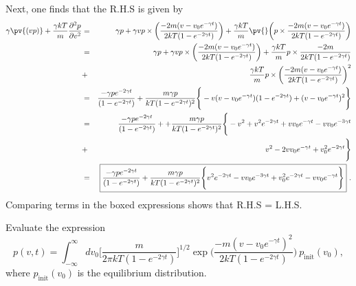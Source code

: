 Next, one finds that the R.H.S is given by
\begin{eqnarray}
\gamma \pv{(vp)} + \frac{\gamma k T}{m} \frac{\partial^2 p}{\partial v^2} &=& \gamma p + \gamma v p \times \bigg( \frac{-2 m (v-v_0 e^{-\gamma t})}{2 k T (1-e^{-2\gamma t})} \bigg) 
+  \frac{\gamma k T}{m} \pv{} \bigg( p \times  \frac{-2 m (v-v_0 e^{-\gamma t})}{2 k T (1-e^{-2\gamma t})}  \bigg) \nonumber \\
&=& \gamma p + \gamma v p \times \bigg( \frac{-2 m (v-v_0 e^{-\gamma t})}{2 k T (1-e^{-2\gamma t})} \bigg) 
+ \frac{\gamma k T}{m}  p \times  \frac{-2 m}{2 k T (1-e^{-2\gamma t})} \nonumber \\
&+& \frac{\gamma k T}{m} p \times \bigg( \frac{-2 m (v-v_0 e^{-\gamma t})}{2 k T (1-e^{-2\gamma t})} \bigg)^2 \nonumber \\
&=& \frac{-\gamma p e^{-2 \gamma t}}{(1-e^{-2 \gamma t})} + \frac{m\gamma p}{k T (1-e^{-2 \gamma t})^2} \Bigg\{ -v (v-v_0 e^{-\gamma t}) (1- e^{-2\gamma t}) +  (v-v_0 e^{-\gamma t})^2\Bigg\} \nonumber \\
&=& \frac{-\gamma p e^{-2 \gamma t}}{(1-e^{-2 \gamma t})} + + \frac{m\gamma p}{k T (1-e^{-2 \gamma t})^2} \Bigg\{ -v^2 + v^2 e^{-2 \gamma t} + v v_0 e^{-\gamma t} - v v_0 e^{-3 \gamma t} \nonumber \\\
&+& v^2 -2 v v_0 e^{-\gamma t} + v_0 ^2 e^{-2 \gamma t} \Bigg\} \nonumber \\
&=& \boxed{\frac{-\gamma p e^{-2 \gamma t}}{(1-e^{-2 \gamma t})} + \frac{m\gamma p}{k T (1-e^{-2 \gamma t})^2} \Bigg\{ v^2 e^{-2 \gamma t} - v v_0 e^{-3 \gamma t} + v_0 ^2 e^{-2 \gamma t} - v v_0 e^{-\gamma t} \Bigg\} }~. \nonumber
\end{eqnarray}
Comparing terms in the boxed expressions shows that R.H.S = L.H.S.


Evaluate the expression
\begin{equation}
p(v, t) = \int_{-\infty}^{\infty} d v_0 \bigg[\frac{m}{2\pi k T (1-e^{-2\gamma t})}\bigg]^{1/2} \exp\bigg(\frac{-m(v-v_0 e^{-\gamma t})^2}{2 k T (1-e^{-2\gamma t})}\bigg)~p_\text{init}(v_0),
\end{equation}
where $p_\text{init}(v_0)$ is the equilibrium distribution. 

